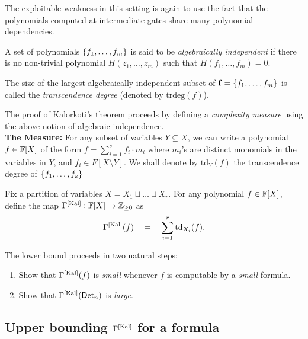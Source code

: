 The exploitable weakness in this setting is again to use the fact that the polynomials computed at intermediate gates share many polynomial dependencies. 

\begin{definition}
  A set of polynomials $\left\{f_1,\dots, f_m\right\}$ is said to be
  \emph{algebraically independent} if there is no non-trivial polynomial 
  $H(z_1,\dots, z_m)$ such that $H(f_1,\dots, f_m)=0$. 

  The size of the largest algebraically independent subset of
  $\mathbf{f}=\left\{f_1,\dots, f_m\right\}$ is called the \emph{transcendence
    degree} (denoted by $\mathrm{trdeg}(f)$).
\end{definition}

The proof of Kalorkoti's theorem proceeds by defining a \emph{complexity measure} using the above notion of algebraic independence. \\


{\bf The Measure:} 
For any subset of variables $Y\subseteq X$, we can write a polynomial
$f \in \mathbb{F}[X]$ of the form $f = \sum_{i=1}^s f_i \cdot m_i$ where $m_i$'s are
distinct monomials in the variables in $Y$, and $f_i \in
F[X \setminus Y]$. 
We shall denote by $\mathrm{td}_Y(f)$ the transcendence degree of $\left\{f_1,\dots, f_s\right\}$


Fix a partition of variables $X = X_1 \sqcup \dots
\sqcup X_r$. 
For any polynomial $f\in \mathbb{F}[X]$, define the map $\Gamma^{\mathrm{[Kal]}}:\mathbb{F}[X]\rightarrow \mathbb{Z}_{\geq 0}$  as
$$
\Gamma^{\mathrm{[Kal]}}(f) \quad=\quad \sum_{i=1}^r \mathrm{td}_{X_i}(f).
$$

The lower bound proceeds in two natural steps:
\begin{enumerate}
\item Show that $\Gamma^{\mathrm{[Kal]}}(f)$ is \emph{small} whenever $f$ is computable by a \emph{small} formula. 
\item Show that $\Gamma^{\mathrm{[Kal]}}(\mathsf{Det}_n)$ is \emph{large}. 
\end{enumerate}

\subsection{Upper bounding $\Gamma^{\mathrm{[Kal]}}$ for a formula}

